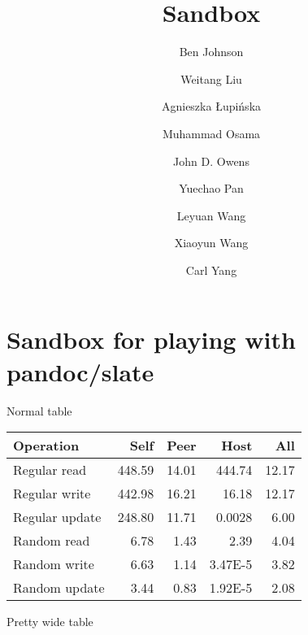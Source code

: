 \documentclass[10pt,oneside]{memoir}
\title{Sandbox}
\author{Ben Johnson \and Weitang Liu \and Agnieszka Łupińska \and Muhammad Osama \and John D. Owens \and Yuechao Pan \and Leyuan Wang \and Xiaoyun Wang \and Carl Yang}
\date{}
\begin{document}
\maketitle

{
\hypersetup{linkcolor=black}
\setcounter{tocdepth}{0}
\tableofcontents*
}
\hypertarget{sandbox-for-playing-with-pandocslate}{%
\chapter{Sandbox for playing with
pandoc/slate}\label{sandbox-for-playing-with-pandocslate}}

Normal table

\begin{longtable}[]{@{}lrrrr@{}}
\toprule
Operation & Self & Peer & Host & All\tabularnewline
\midrule
\endhead
Regular read & 448.59 & 14.01 & 444.74 & 12.17\tabularnewline
Regular write & 442.98 & 16.21 & 16.18 & 12.17\tabularnewline
Regular update & 248.80 & 11.71 & 0.0028 & 6.00\tabularnewline
Random read & 6.78 & 1.43 & 2.39 & 4.04\tabularnewline
Random write & 6.63 & 1.14 & 3.47E-5 & 3.82\tabularnewline
Random update & 3.44 & 0.83 & 1.92E-5 & 2.08\tabularnewline
\bottomrule
\end{longtable}

Pretty wide table
\end{document}
